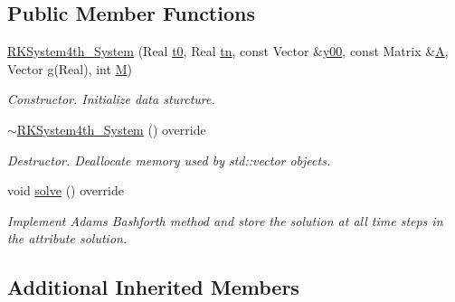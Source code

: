 \subsection*{Public Member Functions}
\begin{DoxyCompactItemize}
\item 
\mbox{\label{class_r_k_system4th___system_a1c7317e4d0987ad09f2e58f931d8e5f0}} 
\mbox{\hyperlink{class_r_k_system4th___system_a1c7317e4d0987ad09f2e58f931d8e5f0}{R\+K\+System4th\+\_\+\+System}} (Real \mbox{\hyperlink{class_o_d_e___system_a1947b357608babc98c5e79d645e24c3c}{t0}}, Real \mbox{\hyperlink{class_o_d_e___system_a5c5a0dd9f04dfb8d8a84d49b741773af}{tn}}, const Vector \&\mbox{\hyperlink{class_o_d_e___system_a1379137a4480e5861fd1911bc061f908}{y00}}, const Matrix \&\mbox{\hyperlink{class_o_d_e___system_a632009677e80b62a1996e842398bf8b6}{A}}, Vector \mbox{\hyperlink{class_o_d_e___system_a2dee2a4b3468547c3ddab15edfc8ddfd}{g}}(Real), int \mbox{\hyperlink{class_o_d_e___system_a46e5ee402ffc7c500dccad753a1fba36}{M}})
\begin{DoxyCompactList}\small\item\em Constructor. Initialize data sturcture. \end{DoxyCompactList}\item 
\mbox{\label{class_r_k_system4th___system_aae823a4345fcf79cde38b100e473346f}} 
\mbox{\hyperlink{class_r_k_system4th___system_aae823a4345fcf79cde38b100e473346f}{$\sim$\+R\+K\+System4th\+\_\+\+System}} () override
\begin{DoxyCompactList}\small\item\em Destructor. Deallocate memory used by std\+::vector objects. \end{DoxyCompactList}\item 
void \mbox{\hyperlink{class_r_k_system4th___system_ae7e9125546c6590f50d581f5e6668c82}{solve}} () override
\begin{DoxyCompactList}\small\item\em Implement Adams Bashforth method and store the solution at all time steps in the attribute solution. \end{DoxyCompactList}\end{DoxyCompactItemize}
\subsection*{Additional Inherited Members}


